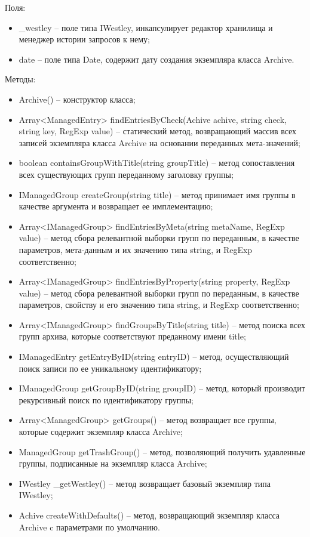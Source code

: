 Поля:
\begin{itemize}
  \item \_westley – поле типа IWestley, инкапсулирует редактор хранилища и менеджер истории запросов к нему;
  \item date – поле типа Date, содержит дату создания экземпляра класса Archive.
\end{itemize}

Методы:
\begin{itemize}
  \item Archive() – конструктор класса;
  \item Array<ManagedEntry> findEntriesByCheck(Achive achive, string check, string key, RegExp value) – статический метод, возвращающий массив всех записей экземпляра класса Archive на основании переданных мета-значений;
  \item boolean containsGroupWithTitle(string groupTitle) – метод сопоставления всех существующих групп переданному заголовку группы;
  \item IManagedGroup createGroup(string title) – метод принимает имя группы в качестве аргумента и возвращает ее имплементацию;
  \item Array<IManagedGroup> findEntriesByMeta(string metaName, RegExp value) – метод сбора релевантной выборки групп по переданным, в качестве параметров, мета-данным и их значению типа string, и RegExp соответственно;
  \item Array<IManagedGroup> findEntriesByProperty(string property, RegExp value) – метод сбора релевантной выборки групп по переданным, в качестве параметров, свойству и его значению типа string, и RegExp соответственно;
  \item Array<IManagedGroup> findGroupsByTitle(string title) – метод поиска всех групп архива, которые соответствуют преданному имени title;
  \item IManagedEntry getEntryByID(string entryID) – метод, осуществляющий поиск записи по ее уникальному идентификатору;
  \item IManagedGroup getGroupByID(string groupID) – метод, который производит рекурсивный поиск по идентификатору группы;
  \item Array<ManagedGroup> getGroups() – метод возвращает все группы, которые содержит экземпляр класса Archive;
  \item ManagedGroup getTrashGroup() – метод, позволяющий получить удавленные группы, подписанные на экземпляр класса Archive;
  \item IWestley \_getWestley() – метод возвращает базовый экземпляр типа IWestley;
  \item Achive createWithDefaults() – метод, возвращающий экземпляр класса Archive c параметрами по умолчанию.
\end{itemize}

